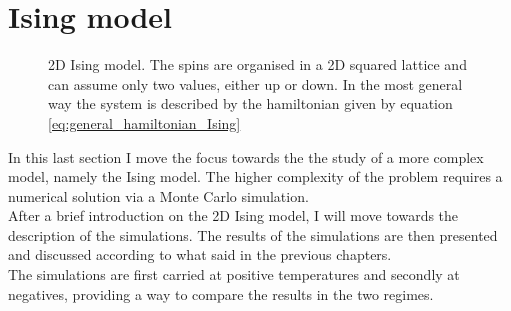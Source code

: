 \chapter{Ising model}
\label{ch:ising}

\begin{figure}[htbp]
    \centering
    \caption{2D Ising model. The spins are organised in a 2D squared lattice and can assume only two values, either up or down. In the most general way the system is described by the hamiltonian given by equation \ref{eq:general_hamiltonian_Ising}}
    \label{fig:IsingLattice}
\end{figure}

In this last section I move the focus towards the the study of a more complex model, namely the Ising model. The higher complexity of the problem requires a numerical solution
via a Monte Carlo simulation. \\
After a brief introduction on the 2D Ising model, I will move towards the description of the simulations. The results of the
simulations are then presented and discussed according to what said in the previous chapters. \\
The simulations are first carried at positive temperatures and secondly at negatives, providing a way to compare the results in the two regimes.

